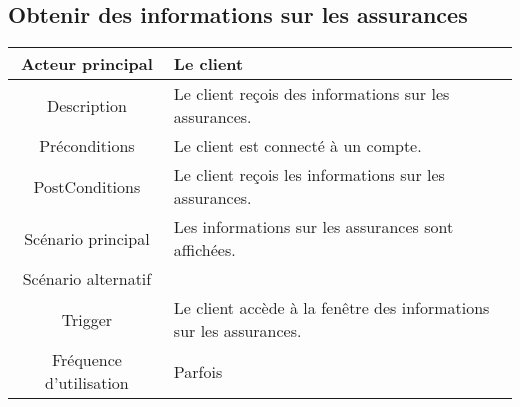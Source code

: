 \documentclass[]{article}
\begin{document}
\subsection{Obtenir des informations sur les assurances}
\begin{table}[h]
    \begin{tabular}{|c|p{10cm}|}
       \hline
       Acteur principal&Le client\\
       \hline
       Description&Le client reçois des informations sur les assurances.\\
       \hline
       Préconditions&Le client est connecté à un compte.\\
       \hline
       PostConditions&Le client reçois les informations sur les assurances.\\
       \hline
       Scénario principal&Les informations sur les assurances sont affichées.\\
       \hline
       Scénario alternatif&\\
       \hline
       Trigger&Le client accède à la fenêtre des informations sur les assurances.\\
       \hline
       Fréquence d'utilisation&Parfois\\
       \hline
    \end{tabular}
 \end{table}

\newpage

\end{document}
